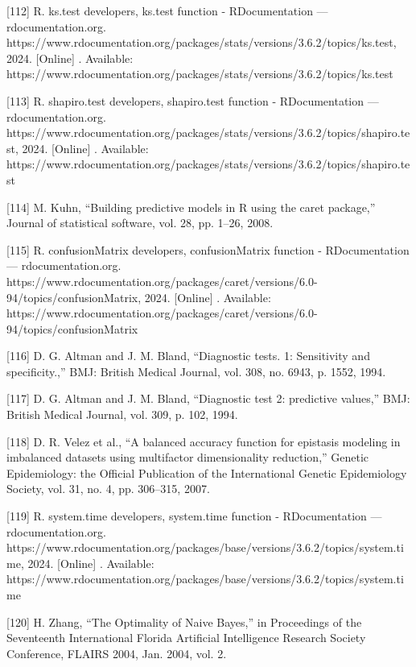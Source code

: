 \documentclass[sn-mathphys-num]{sn-jnl}%
\begin{document}
[112] R. ks.test developers, ks.test function - RDocumentation — rdocumentation.org. https://www.rdocumentation.org/packages/stats/versions/3.6.2/topics/ks.test, 2024. [Online] . Available: https://www.rdocumentation.org/packages/stats/versions/3.6.2/topics/ks.test

[113] R. shapiro.test developers, shapiro.test function - RDocumentation — rdocumentation.org. https://www.rdocumentation.org/packages/stats/versions/3.6.2/topics/shapiro.test, 2024. [Online] . Available: https://www.rdocumentation.org/packages/stats/versions/3.6.2/topics/shapiro.test

[114] M. Kuhn, “Building predictive models in R using the caret package,” Journal of statistical software, vol. 28, pp. 1–26, 2008.

[115] R. confusionMatrix developers, confusionMatrix function - RDocumentation — rdocumentation.org. https://www.rdocumentation.org/packages/caret/versions/6.0-94/topics/confusionMatrix, 2024. [Online] . Available: https://www.rdocumentation.org/packages/caret/versions/6.0-94/topics/confusionMatrix

[116] D. G. Altman and J. M. Bland, “Diagnostic tests. 1: Sensitivity and specificity.,” BMJ: British Medical Journal, vol. 308, no. 6943, p. 1552, 1994.

[117] D. G. Altman and J. M. Bland, “Diagnostic test 2: predictive values,” BMJ: British Medical Journal, vol. 309, p. 102, 1994.

[118] D. R. Velez et al., “A balanced accuracy function for epistasis modeling in imbalanced datasets using multifactor dimensionality reduction,” Genetic Epidemiology: the Official Publication of the International Genetic Epidemiology Society, vol. 31, no. 4, pp. 306–315, 2007.

[119] R. system.time developers, system.time function - RDocumentation — rdocumentation.org. https://www.rdocumentation.org/packages/base/versions/3.6.2/topics/system.time, 2024. [Online] . Available: https://www.rdocumentation.org/packages/base/versions/3.6.2/topics/system.time

[120] H. Zhang, “The Optimality of Naive Bayes,” in Proceedings of the Seventeenth International Florida Artificial Intelligence Research Society Conference, FLAIRS 2004, Jan. 2004, vol. 2.
\end{document}
